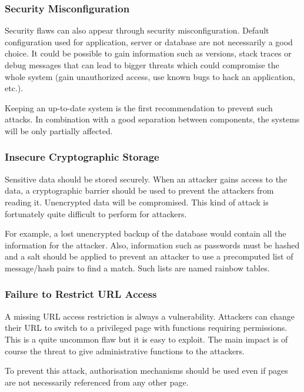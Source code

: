 \subsubsection{Security Misconfiguration}

Security flaws can also appear through security misconfiguration. Default
configuration used for application, server or database are not necessarily a
good choice. It could be possible to gain information such as versions,
stack traces or debug messages that can lead to bigger threats which could
compromise the whole system (gain unauthorized access, use known bugs to hack
an application, etc.).

Keeping an up-to-date system is the first recommendation to prevent such
attacks. In combination with a good separation between components, the systems
will be only partially affected.

\subsubsection{Insecure Cryptographic Storage}

Sensitive data should be stored securely.
When an attacker gains access to the data, a cryptographic barrier should be
used to prevent the attackers from reading it. Unencrypted data will be
compromised. This kind of attack is fortunately quite difficult to perform for
attackers.

For example, a lost unencrypted backup of the database would contain all the
information for the attacker.
Also, information such as passwords must be hashed and a salt should be
applied to prevent an attacker to use a precomputed list of
message/hash pairs to find a match. Such lists are named rainbow tables.

\subsubsection{Failure to Restrict URL Access}

A missing URL access restriction is always a vulnerability.
Attackers can change their URL to switch to a privileged page with functions
requiring permissions.
This is a quite uncommon flaw but it is easy to exploit. The main impact is of
course the threat to give administrative functions to the attackers.

To prevent this attack, authorisation mechanisms should be used even if
pages are not necessarily referenced from any other page.

